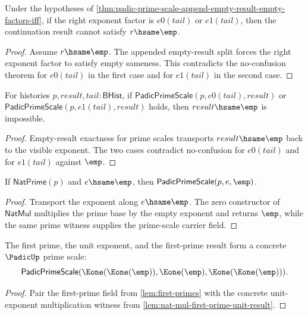 \begin{theorem}
\label{thm:padic-prime-scale-append-visible-right-exponent-result-nonempty}
Under the hypotheses of
\autoref{thm:padic-prime-scale-append-empty-result-empty-factors-iff}, if the
right exponent factor is $e0(tail)$ or $e1(tail)$, then the continuation
result cannot satisfy $r\hsame\emp$.
\end{theorem}
\begin{proof}
Assume $r\hsame\emp$. The appended empty-result split forces the right
exponent factor to satisfy empty sameness. This contradicts the no-confusion
theorem for $e0(tail)$ in the first case and for $e1(tail)$ in the second
case.
\end{proof}

\begin{theorem}
\label{thm:padic-prime-scale-visible-exponent-result-nonempty}
For histories $p,result,tail:\mathsf{BHist}$, if
$\mathsf{PadicPrimeScale}(p,e0(tail),result)$ or
$\mathsf{PadicPrimeScale}(p,e1(tail),result)$ holds, then
$result\hsame\emp$ is impossible.
\end{theorem}
\begin{proof}
Empty-result exactness for prime scales transports $result\hsame\emp$ back to
the visible exponent. The two cases contradict no-confusion for $e0(tail)$ and
for $e1(tail)$ against $\emp$.
\end{proof}

\begin{theorem}
\label{thm:padic-prime-scale-empty-exponent-result-empty}
If $\mathsf{NatPrime}(p)$ and $e\hsame\emp$, then
$\mathsf{PadicPrimeScale}(p,e,\emp)$.
\end{theorem}
\begin{proof}
Transport the exponent along $e\hsame\emp$. The zero constructor of
$\mathsf{NatMul}$ multiplies the prime base by the empty exponent and returns
$\emp$, while the same prime witness supplies the prime-scale carrier field.
\end{proof}

\begin{theorem}
\label{thm:padic-prime-scale-first-prime-unit-exponent-result}
The first prime, the unit exponent, and the first-prime result form a concrete
\(\PadicUp\) prime scale:
$$
\mathsf{PadicPrimeScale}(\Eone(\Eone(\emp)),\Eone(\emp),\Eone(\Eone(\emp))).
$$
\end{theorem}
\begin{proof}
Pair the first-prime field from \autoref{lem:first-primes} with the concrete
unit-exponent multiplication witness from
\autoref{lem:nat-mul-first-prime-unit-result}.
\end{proof}

